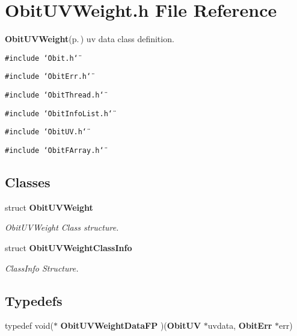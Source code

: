 \section{Obit\-UVWeight.h File Reference}
\label{ObitUVWeight_8h}
{\bf Obit\-UVWeight}{\rm (p.\,\pageref{structObitUVWeight})} uv data class definition. 

{\tt \#include \char`\"{}Obit.h\char`\"{}}\par
{\tt \#include \char`\"{}Obit\-Err.h\char`\"{}}\par
{\tt \#include \char`\"{}Obit\-Thread.h\char`\"{}}\par
{\tt \#include \char`\"{}Obit\-Info\-List.h\char`\"{}}\par
{\tt \#include \char`\"{}Obit\-UV.h\char`\"{}}\par
{\tt \#include \char`\"{}Obit\-FArray.h\char`\"{}}\par
\subsection*{Classes}
\begin{CompactItemize}
\item 
struct {\bf Obit\-UVWeight}
\begin{CompactList}\small\item\em Obit\-UVWeight Class structure. \item\end{CompactList}\item 
struct {\bf Obit\-UVWeight\-Class\-Info}
\begin{CompactList}\small\item\em Class\-Info Structure. \item\end{CompactList}\end{CompactItemize}
\subsection*{Typedefs}
\begin{CompactItemize}
\item 
typedef void($\ast$ {\bf Obit\-UVWeight\-Data\-FP} )({\bf Obit\-UV} $\ast$uvdata, {\bf Obit\-Err} $\ast$err)
\end{CompactItemize}
